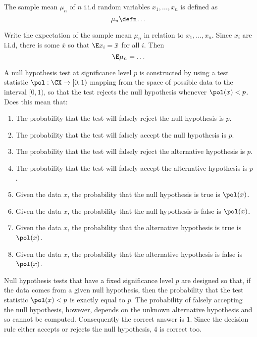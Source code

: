 \documentclass[a4paper]{article}
\begin{document}
\begin{exercise}
  The sample mean $\mu_n$ of $n$  i.i.d random variables $x_1, \ldots, x_n$ is defined as
  \[
  \mu_n \defn
  \ifdefined \solution
  \frac{1}{n} \sum_{i=1}^n x_i
  \else
  \ldots 
  \fi
  \]
\end{exercise}

\begin{exercise}
  Write the expectation of the sample mean $\mu_n$ in relation to $x_1, \ldots, x_n$.
  \ifdefined \solution
  Since $x_i$ are i.i.d, there is some $\bar{x}$ so that $\E x_i = \bar{x}$ for all $i$. Then
  \fi
  \[
  \E \mu_n =
  \ifdefined \solution
  \E \frac{1}{n} \sum_{i=1}^n x_i
  = \frac{1}{n} \sum_{i=1}^n \E x_i = \bar{x}
  \else
  \ldots
  \fi
  \]

\end{exercise}

\begin{exercise}
  A null hypothesis test at significance level $p$ is constructed by using a test statistic $\pol: \CX \to [0,1)$ mapping from the space of possible data to the interval $[0,1)$, so that the test rejects the null hypothesis whenever $\pol(x) < p$. Does this mean that:
  \begin{enumerate}
  \item The probability that the test will falsely reject the null hypothesis is $p$.
  \item The probability that the test will falsely accept the null hypothesis is $p$.
  \item The probability that the test will falsely reject the alternative hypothesis is $p$.
  \item The probability that the test will falsely accept the alternative hypothesis is $p$.
  \item Given the data $x$, the probability that the null hypothesis is true is $\pol(x)$.
  \item Given the data $x$, the probability that the null hypothesis is false is $\pol(x)$.
  \item Given the data $x$, the probability that the alternative hypothesis is true is $\pol(x)$.
  \item Given the data $x$, the probability that the alternative hypothesis is false is $\pol(x)$.
  \end{enumerate}
  \end{exercise}
  \ifdefined \solution
  Null hypothesis tests that have a fixed significance level $p$ are designed so that, if the data comes from a given null hypothesis, then the probability that the test statistic $\pol(x) < p$ is exactly equal to $p$. The probability of falsely accepting the null hypothesis, however, depends on the unknown alternative hypothesis and so cannot be computed. Consequently the correct answer is $1$. Since the decision rule either accepts or rejects the null hypothesis, $4$ is correct too.
  \fi
\end{document}
